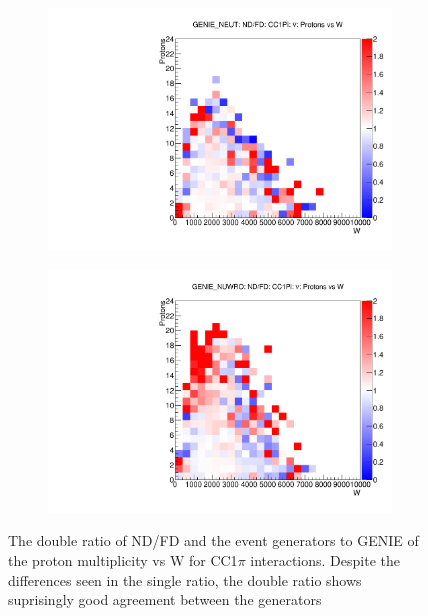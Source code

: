\documentclass[12pt]{article}
\begin{document}
\begin{figure}
\centering
\begin{subfigure}[b]{0.32\textwidth}
  \includegraphics[width=\textwidth]{nprotons_w/Nprotons_W_nuc_rest_res_GENIE_NEUT_ND_FD_numu_norm.pdf}
\end{subfigure}
\begin{subfigure}[b]{0.32\textwidth}
  \includegraphics[width=\textwidth]{nprotons_w/Nprotons_W_nuc_rest_res_GENIE_NUWRO_ND_FD_numu_norm.pdf}
\end{subfigure}
\caption{The double ratio of ND/FD and the event generators to GENIE of the proton multiplicity vs W for CC1$\pi$ interactions.  Despite the differences seen in the single ratio, the double ratio shows suprisingly good agreement between the generators}
\label{fig:Proton_w_res_ND_FD_GENIE}
\end{figure}
\end{document}
